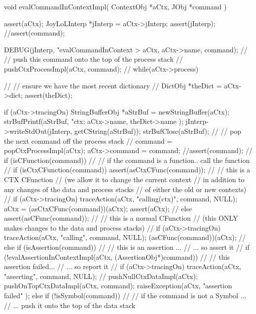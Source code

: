 \startCCode
void evalCommandInContextImpl(
  ContextObj *aCtx,
  JObj       *command
) {
  assert(aCtx);
  JoyLoLInterp *jInterp = aCtx->jInterp;
  assert(jInterp);
  //assert(command);
  
  DEBUG(jInterp, "evalCommandInContext > %
    aCtx, aCtx->name, command);
  //
  // push this command onto the top of the process stack
  //
  pushCtxProcessImpl(aCtx, command);
  //
  while(aCtx->process) {
    //
    // ensure we have the most recent dictionary
    //
    DictObj *theDict = aCtx->dict;
    assert(theDict);
    
    if (aCtx->tracingOn) {
      StringBufferObj *aStrBuf = newStringBuffer(aCtx);
      strBufPrintf(aStrBuf,
        "\n ctx: %
        aCtx->name, theDict->name
      );
      jInterp->writeStdOut(jInterp, getCString(aStrBuf));
      strBufClose(aStrBuf);
    }
    //
    // pop the next command off the process stack
    //
    command = popCtxProcessImpl(aCtx);
    aCtx->command = command;
    //assert(command);
    //
    if (isCFunction(command)) {
      //
      // if the command is a function.. call the function
      //
      if (isCtxCFunction(command)) {
        assert(asCtxCFunc(command));
        //
        // this is a CTX CFunction
        // (we allow it to change the current context
        //  in addition to any changes of the data and process stacks
        //  of either the old or new contexts)
        //
        if (aCtx->tracingOn) 
          traceAction(aCtx, "calling(ctx)", command, NULL);
        aCtx = (asCtxCFunc(command))(aCtx);
        assert(aCtx);
        //
      } else {
        assert(asCFunc(command));
        //
        // this is a normal CFunction
        // (this ONLY makes changes to the data and process stacks)
        //
        if (aCtx->tracingOn) 
          traceAction(aCtx, "calling", command, NULL);
        (asCFunc(command))(aCtx);
        //
      }
    } else if (isAssertion(command)) {
      //
      // this is an assertion ...
      //   ... so assert it 
      //
      if (!evalAssertionInContextImpl(aCtx, (AssertionObj*)command)) {
        //
        // this assertion failed... 
        //   ... so report it
        //
        if (aCtx->tracingOn) 
          traceAction(aCtx, "asserting", command, NULL);
        //
        pushNullCtxDataImpl(aCtx);
        pushOnTopCtxDataImpl(aCtx, command);
        raiseException(aCtx,
          "assertion failed"
        );
      }
    } else if (!isSymbol(command)) {
      //
      // if the command is not a Symbol ...
      //  ...  push it onto the top of the data stack
}}}
